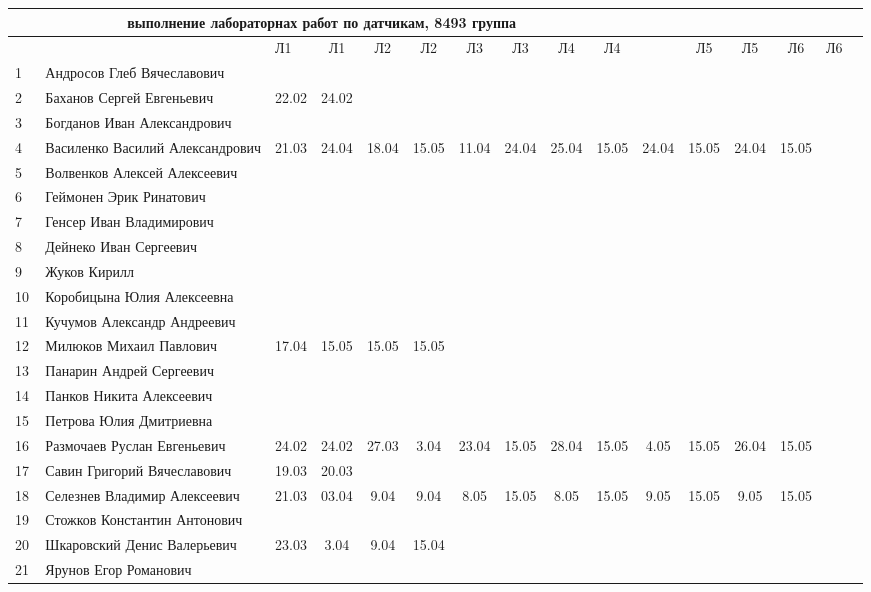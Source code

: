 \documentclass[a4paper,landscape,11pt]{article}
\begin{document}
\newpage
%
\begin{tabular}{l|llccccccccccccc}
\multicolumn{10}{c}{выполнение лабораторнах работ по датчикам, 8493 группа} \\
\toprule
&&Л1&Л1& Л2&Л2& Л3&Л3& Л4&Л4& &Л5&Л5& Л6&Л6\\
\midrule
1\,&  Андросов Глеб Вячеславович      &      &      &&&&&&\\
2\,&  Баханов Сергей Евгеньевич       & 22.02& 24.02&&&&&&\\
3\,&  Богданов Иван Александрович     &      &      &&&&&&\\
	4\,&  Василенко Василий Александрович & 21.03& 24.04& 18.04& 15.05&11.04&24.04&25.04&15.05&24.04&15.05& 24.04&15.05\\
5\,&  Волвенков Алексей Алексеевич    &      &      &&&&&&\\
\midrule                                            
6\,&  Геймонен Эрик Ринатович         &      &      &&&&&&\\
7\,&  Генсер Иван Владимирович        &      &      &&&&&&\\
8\,&  Дейнеко Иван Сергеевич          &      &      &&&&&&\\
9\,&  Жуков Кирилл                    &      &      &&&&&&\\
10\,& Коробицына Юлия Алексеевна      &      &      &&&&&&\\
\midrule                                            
11\,& Кучумов Александр Андреевич     &      &      &&&&&&\\
12\,& Милюков Михаил Павлович         &17.04 & 15.05&15.05&15.05&&&&\\
13\,& Панарин Андрей Сергеевич        &      &      &&&&&&\\
14\,& Панков Никита Алексеевич        &      &      &&&&&&\\
15\,& Петрова Юлия Дмитриевна         &      &      &&&&&&\\
\midrule                                            
	16\,& Размочаев Руслан Евгеньевич     & 24.02& 24.02& 27.03&  3.04&23.04& 15.05& 28.04&15.05& 4.05& 15.05 & 26.04 & 15.05\\
17\,& Савин Григорий Вячеславович     & 19.03& 20.03&&&&&&\\
	18\,& Селезнев Владимир Алексеевич    & 21.03& 03.04&  9.04& 9.04 & 8.05& 15.05& 8.05& 15.05 & 9.05& 15.05& 9.05& 15.05\\
19\,& Стожков Константин Антонович    &      &      &&&&&&\\
20\,& Шкаровский Денис Валерьевич     & 23.03& 3.04 & 9.04& 15.04&&&&\\
\midrule                                            
21\,& Ярунов Егор Романович           &      &      &&&&&&\\
\bottomrule
\end{tabular}
\end{document}

